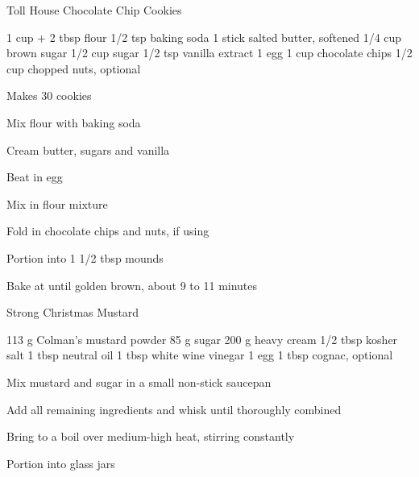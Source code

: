 \begin{recipe}{Toll House Chocolate Chip Cookies}{\vegetarian{}}
\begin{ingredients}
1 cup + 2 tbsp flour
1/2 tsp baking soda
1 stick salted butter, softened
1/4 cup brown sugar
1/2 cup sugar
1/2 tsp vanilla extract
1 egg
1 cup chocolate chips
1/2 cup chopped nuts, optional
\end{ingredients}
\nextcolumn
Makes 30 cookies
\begin{steps}
    \item Mix flour with baking soda
    \item Cream butter, sugars and vanilla
    \item Beat in egg
    \item Mix in flour mixture
    \item Fold in chocolate chips and nuts, if using
    \item Portion into 1 1/2 tbsp mounds
    \item Bake at  until golden brown, about 9 to 11 minutes
\end{steps}
\end{recipe}

\begin{recipe}{Strong Christmas Mustard}{\vegetarian{}}
\begin{ingredients}
113 g Colman's mustard powder
85 g sugar
200 g heavy cream
1/2 tbsp kosher salt
1 tbsp neutral oil
1 tbsp white wine vinegar
1 egg
1 tbsp cognac, \mbox{optional}
\end{ingredients}
\nextcolumn
\begin{steps}
    \item Mix mustard and sugar in a small non-stick saucepan
    \item Add all remaining ingredients and whisk until thoroughly combined
    \item Bring to a boil over medium-high heat, stirring constantly
    \item Portion into glass jars
\end{steps}
\end{recipe}

